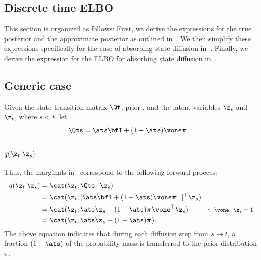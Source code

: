 \documentclass{article} %
\def\prior{\text{$\boldsymbol{\mathit{\pi}}$}}
\begin{document}
{\setcounter{tocdepth}{2}
\tableofcontents
\allowdisplaybreaks
\begin{appendices}

\section{Discrete time ELBO}\label{app:sec:d3pm}
This section is organized as follows: First, we derive the expressions for the true posterior and the approximate posterior as outlined in~. We then simplify these expressions specifically for the case of absorbing state diffusion in~. Finally, we derive the expression for the ELBO for absorbing state diffusion in~.

\subsection{Generic case}\label{supp:subsec:d3pm_generic}
Given the state transition matrix $\Qt$, prior \prior{}, and the latent variables $\z_s$ and $\z_t$, where $s < t$, 
let
\begin{align}\label{eqn:d3pm_Q_discrete_old}
    \Qts = \ats \bfI+ (1 - \ats)\vone \prior^\top.
\end{align}
\subsubsection{\texorpdfstring{$q(\z_t | \z_s)$}{Lg}}
Thus, the marginals in~ correspond to the following forward process:
\begin{align}\label{supp:eqn:one_step_forward}
    q(\z_t | \z_s)
    & = \cat(\z_t; \Qts^\top\z_s \nonumber) & \\
    & = \cat(\z_t; [\ats \bfI+ (1 - \ats)\vone \prior^\top]^\top\z_s) \nonumber & \\
    & = \cat(\z_t; \ats \z_s + (1 - \ats)\prior \vone^\top\z_s) & \text{\footnotesize $\because \vone^\top \z_s = 1$}\nonumber \\
    & = \cat(\z_t; \ats \z_s + (1 - \ats)\prior).
\end{align}
The above equation indicates that during each diffusion step from $s \to t$,
a fraction $(1 - \ats)$ of the probability mass is transferred to the prior distribution $\prior{}$. 

\end{appendices}}
\end{document}
